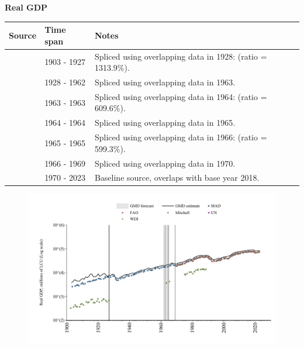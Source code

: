\documentclass[12pt,a4paper,landscape]{article}
\begin{document}
\begin{adjustbox}{max totalsize={\paperwidth}{\paperheight},center}
\begin{minipage}[t][\textheight][t]{\textwidth}
\vspace*{0.5cm}
{}
\begin{center}
{\Large\bfseries Real GDP}
\end{center}
\vspace{0.5cm}
\begin{table}[H]
\centering
\small
\begin{tabular}{|l|l|l|}
\hline
\textbf{Source} & \textbf{Time span} & \textbf{Notes} \\
\hline
\rowcolor{white}\cite{Mitchell}& 1903 - 1927 &Spliced using overlapping data in 1928: (ratio = 1313.9\%). \\
\rowcolor{lightgray}\cite{MAD}& 1928 - 1962 &Spliced using overlapping data in 1963. \\
\rowcolor{white}\cite{Mitchell}& 1963 - 1963 &Spliced using overlapping data in 1964: (ratio = 609.6\%). \\
\rowcolor{lightgray}\cite{MAD}& 1964 - 1964 &Spliced using overlapping data in 1965. \\
\rowcolor{white}\cite{Mitchell}& 1965 - 1965 &Spliced using overlapping data in 1966: (ratio = 599.3\%). \\
\rowcolor{lightgray}\cite{MAD}& 1966 - 1969 &Spliced using overlapping data in 1970. \\
\rowcolor{white}\cite{WDI}& 1970 - 2023 &Baseline source, overlaps with base year 2018. \\
\hline
\end{tabular}
\end{table}
\begin{figure}[H]
\centering
\includegraphics[width=\textwidth,height=0.6\textheight,keepaspectratio]{graphs/CUB_rGDP.pdf}
\end{figure}
\end{minipage}
\end{adjustbox}
\end{document}
